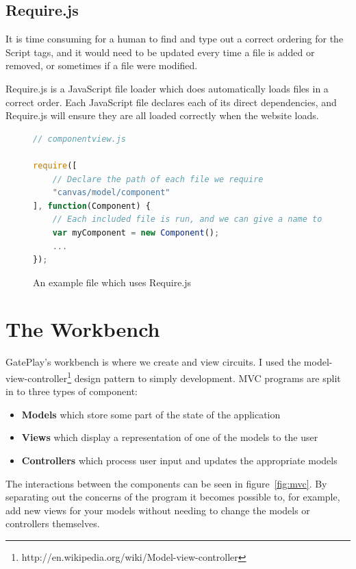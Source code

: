\subsection{Require.js}
It is time consuming for a human to find and type out a correct ordering for the Script tags, and it would need to be updated every time a file is added or removed, or sometimes if a file were modified.

Require.js is a JavaScript file loader which does automatically loads files in a correct order. Each JavaScript file declares each of its direct dependencies, and Require.js will ensure they are all loaded correctly when the website loads.

\begin{figure}[H]
\begin{lstlisting}[language=JavaScript]
// componentview.js

require([
	// Declare the path of each file we require	
	"canvas/model/component"
], function(Component) {
	// Each included file is run, and we can give a name to whatever it returns if desired
	var myComponent = new Component();
	...
});
\end{lstlisting}
\caption{An example file which uses Require.js}
\end{figure}

\section{The Workbench}
\label{section:workbench}
GatePlay's workbench is where we create and view circuits. I used the model-view-controller\footnote{http://en.wikipedia.org/wiki/Model-view-controller} design pattern to simply development. MVC programs are split in to three types of component:

\begin{itemize}
	\item \textbf{Models} which store some part of the state of the application
	\item \textbf{Views} which display a representation of one of the models to the user
	\item \textbf{Controllers} which process user input and updates the appropriate models
\end{itemize}

The interactions between the components can be seen in figure~\ref{fig:mvc}. By separating out the concerns of the program it becomes possible to, for example, add new views for your models without needing to change the models or controllers themselves.

